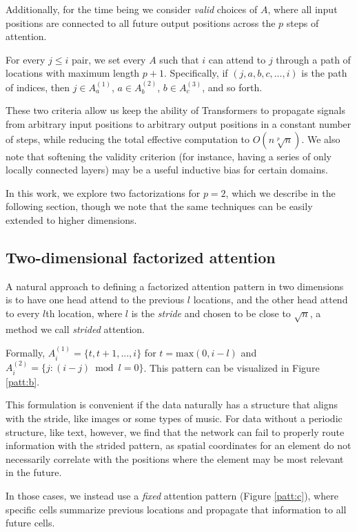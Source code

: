 \documentclass{article}
\begin{document}
Additionally, for the time being we consider \textit{valid} choices of $A$, where all input positions are connected to all future output positions across the $p$ steps of attention.

For every $j \le i$ pair, we set every $A$ such that $i$ can attend to $j$ through a path of locations with maximum length $p+1$. Specifically, if $(j, a, b, c, ..., i)$ is the path of indices, then $j \in A_{a}^{(1)}$, $a \in A_{b}^{(2)}$, $b \in A_{c}^{(3)}$, and so forth.

These two criteria allow us keep the ability of Transformers to propagate signals from arbitrary input positions to arbitrary output positions in a constant number of steps, while reducing the total effective computation to $O(n \sqrt[p]{n})$. We also note that softening the validity criterion (for instance, having a series of only locally connected layers) may be a useful inductive bias for certain domains.

In this work, we explore two factorizations for $p=2$, which we describe in the following section, though we note that the same techniques can be easily extended to higher dimensions.

\subsection{Two-dimensional factorized attention}
A natural approach to defining a factorized attention pattern in two dimensions is to have one head attend to the previous $l$ locations, and the other head attend to every $l$th location, where $l$ is the \textit{stride} and chosen to be close to $\sqrt{n}$, a method we call \textit{strided} attention. 

Formally, $A_{i}^{(1)} = \{t, t+1, ..., i \}$ for $t = \mathrm{max}(0, i-l)$ and $A_{i}^{(2)} = \{j : (i - j) \bmod l = 0 \}$. This pattern can be visualized in Figure \ref{patt:b}.

This formulation is convenient if the data naturally has a structure that aligns with the stride, like images or some types of music. For data without a periodic structure, like text, however, we find that the network can fail to properly route information with the strided pattern, as spatial coordinates for an element do not necessarily correlate with the positions where the element may be most relevant in the future.

In those cases, we instead use a \textit{fixed} attention pattern (Figure \ref{patt:c}), where specific cells summarize previous locations and propagate that information to all future cells.
\end{document}
